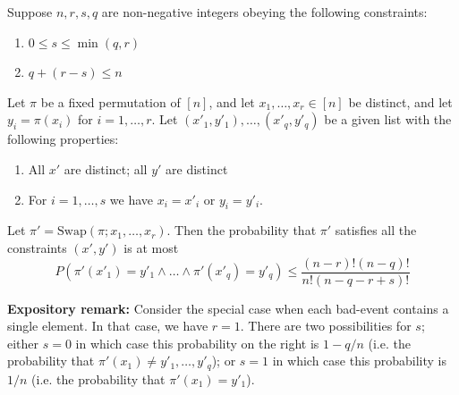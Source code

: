\begin{proposition}
\label{exchange-prop2a}
Suppose $n,r,s,q$ are non-negative integers obeying the following constraints:
\begin{enumerate}
\item $0 \leq s \leq \min(q,r)$
\item $q + (r-s) \leq n$
\end{enumerate}

Let $\pi$ be a fixed permutation of $[n]$, and let $x_1, \dots, x_r \in [n]$ be distinct, and let $y_i = \pi(x_i)$ for $i = 1, \dots, r$.  Let $(x'_1, y'_1), \dots, (x'_q, y'_q)$ be a given list with the following properties:

\begin{enumerate}
\item[(3)] All $x'$ are distinct; all $y'$ are distinct
\item[(4)] For $i = 1, \dots, s$ we have $x_i = x'_i$ or $y_i = y'_i$.
\end{enumerate}

Let $\pi' = \text{Swap}(\pi; x_1, \dots, x_r)$. Then the probability that $\pi'$ satisfies all the constraints $(x', y')$ is at most
$$
P(\pi'(x'_1) = y'_1 \wedge \dots \wedge \pi'(x'_q) = y'_q) \leq \frac{(n-r)! (n-q)!}{n! (n-q - r + s)!} 
$$

\textbf{Expository remark:} Consider the special case when each bad-event contains a single element. In that case, we have $r = 1$. There are two possibilities for $s$; either $s = 0$ in which case this probability on the right is $1 - q/n$ (i.e. the probability that $\pi'(x_1) \neq y'_1, \dots, y'_q$); or $s = 1$ in which case this probability is $1/n$ (i.e. the probability that $\pi'(x_1) = y'_1$).


\end{proposition}
